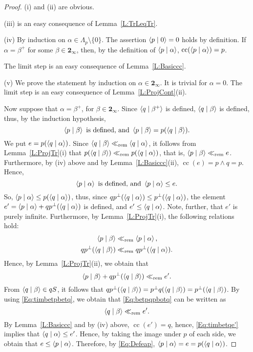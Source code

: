 \documentclass[psamsfonts,reqno]{memo-l}
\theoremstyle{plain}
\theoremstyle{definition}
\theoremstyle{remark}
\numberwithin{equation}{section}
\newcommand{\Cn}{\mathbf{2}_{\infty}}
\newcommand{\rem}{\ll_{\mathrm{rem}}}
\newcommand{\scal}[2]{\left\langle\nobreak#1\nobreak\mid\nobreak#2
\nobreak\right\rangle}
\DeclareMathOperator{\cc}{cc}
\newcommand{\set}[1]{\{#1\}}
\begin{document}
\begin{proof}
(i) and (ii) are obvious.

(iii) is an easy consequence of Lemma~\ref{L:TrLeqTr}.

(iv) By induction on $\alpha\in\Lambda_p\setminus\set{0}$. The assertion
$\scal{p}{0}=0$ holds by definition. If $\alpha=\beta^+$ for some
$\beta\in\Cn$, then, by the definition of $\scal{p}{\alpha}$,
$\cc(\scal{p}{\alpha})=p$.

The limit step is an easy consequence of Lemma~\ref{L:Basiccc}.

(v) We prove the statement by induction on $\alpha\in\Cn$. It is trivial
for $\alpha=0$. The limit step is an easy consequence of
Lemma~\ref{L:ProjCont}(ii).

Now suppose that $\alpha=\beta^+$, for $\beta\in\Cn$.
Since $\scal{q}{\beta^+}$ is defined, $\scal{q}{\beta}$ is defined,
thus, by the induction hypothesis,
   \begin{equation}\label{Eq:timbetpbetq}
   \scal{p}{\beta}\text{ is defined, and }\scal{p}{\beta}=p(\scal{q}{\beta}).
   \end{equation}
We put $e=p(\scal{q}{\alpha})$. Since
$\scal{q}{\beta}\rem\scal{q}{\alpha}$, it follows from
Lemma~\ref{L:ProjTr}(i) that
$p(\scal{q}{\beta})\rem p(\scal{q}{\alpha})$, that is,
$\scal{p}{\beta}\rem e$. Furthermore, by (iv) above
and by Lemma~\ref{L:Basiccc}(ii), $\cc(e)=p\wedge q=p$. Hence,
   \begin{equation}\label{Eq:Defeap}
   \scal{p}{\alpha}\text{ is defined, and }\scal{p}{\alpha}\leq e.
   \end{equation}
So, $\scal{p}{\alpha}\leq p(\scal{q}{\alpha})$, thus, since
$qp^\bot(\scal{q}{\alpha})\leq p^\bot(\scal{q}{\alpha})$, the element
$e'=\scal{p}{\alpha}+qp^\bot(\scal{q}{\alpha})$ is defined, and
$e'\leq \scal{q}{\alpha}$. Note, further, that $e'$ is purely infinite.
Furthermore, by Lemma~\ref{L:ProjTr}(i), the following relations hold:
   \begin{align*}
   \scal{p}{\beta}&\rem\scal{p}{\alpha},\\
   qp^\bot(\scal{q}{\beta})&\rem qp^\bot(\scal{q}{\alpha}).
   \end{align*}
Hence, by Lemma~\ref{L:ProjTr}(ii), we obtain that
   \begin{equation}\label{Eq:betpqpbotq}
   \scal{p}{\beta}+qp^\bot(\scal{q}{\beta})\rem e'.
   \end{equation}
{}From $\scal{q}{\beta}\in qS$, it follows that
$qp^\bot(\scal{q}{\beta})=
p^\bot q(\scal{q}{\beta})=p^\bot(\scal{q}{\beta})$. By using
\eqref{Eq:timbetpbetq}, we obtain that \eqref{Eq:betpqpbotq} can be written
as
   \begin{equation}\label{Eq:timbetqe'}
   \scal{q}{\beta}\rem e'.
   \end{equation}
By Lemma~\ref{L:Basiccc} and by (iv) above, $\cc(e')=q$, hence,
\eqref{Eq:timbetqe'} implies that $\scal{q}{\alpha}\leq e'$.
Hence, by taking the image under $p$ of each side, we obtain that
$e\leq\scal{p}{\alpha}$. Therefore, by \eqref{Eq:Defeap},
$\scal{p}{\alpha}=e=p(\scal{q}{\alpha})$.


\end{proof}
\end{document}
